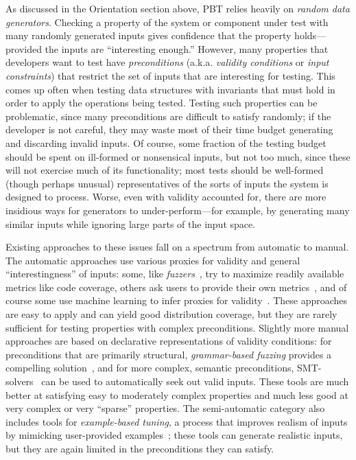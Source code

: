 As discussed in the Orientation section above, PBT relies heavily on {\em random data
generators}.  Checking a property of the system or component under
test with many randomly generated inputs gives confidence that the property
holds---provided the inputs are ``interesting enough.''
%
However,
many properties that developers want to test have {\em preconditions}
(a.k.a.{} {\em validity conditions} or {\em input constraints}) that
restrict the set of inputs that are interesting for testing. This comes up often
when testing data structures with invariants that must hold in order to apply
the operations being tested. Testing such properties can be problematic, since
many preconditions are difficult to satisfy randomly; if the developer is not
careful, they may waste most of their time budget generating and
discarding invalid inputs.
%
Of course, some fraction of the testing budget should be spent on
ill-formed or nonsensical inputs, but not too much, since these will not
exercise much of its functionality; most tests should be well-formed
(though perhaps unusual) representatives of the sorts of inputs the
system is designed to process.
%
Worse, even with validity accounted for, there are
more insidious ways for generators to under-perform---for example, by
generating many similar inputs while ignoring large parts of
the input space.

Existing approaches to these issues
fall on a spectrum from automatic to manual. The automatic approaches use
various proxies for validity and general ``interestingness'' of
inputs: some, like {\em
fuzzers}~\cite{afl-readme}, try to maximize readily available metrics like code
coverage, others ask users to provide their own metrics~\cite{loscher2017targetedpbt}, and
of course some use machine learning to infer proxies for
validity~\cite{godefroid2017learn, DBLP:conf/icse/ReddyLPS20}. These approaches
are easy to apply and can yield good distribution coverage, but they are rarely
sufficient for testing properties with complex preconditions. Slightly more
manual approaches are based on declarative representations of validity
conditions: for preconditions that are primarily structural, {\em grammar-based
fuzzing} provides a compelling solution~\cite{godefroid2008grammar,
holler2012fuzzing, veggalam2016ifuzzer, wang2019superion,
srivastava2021gramatron}, and for more complex, semantic preconditions,
SMT-solvers~\cite{dewey2017automated, LuckPOPL,
steinhofel2022input} can be used to automatically seek out valid
inputs. These tools are
much better at satisfying easy to moderately complex properties and
much less good at very complex or very ``sparse'' properties. The semi-automatic
category also includes tools for {\em example-based tuning}, a process that
improves realism of inputs by mimicking user-provided
examples~\cite{soremekun2020inputs}; these tools can generate
realistic inputs, but they are again limited in the preconditions they can
satisfy.

